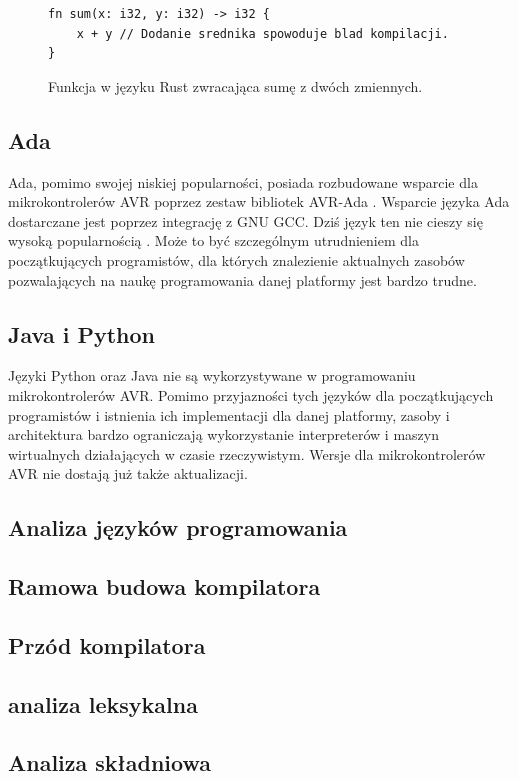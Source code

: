 \begin{figure}
\begin{lstlisting}
fn sum(x: i32, y: i32) -> i32 {
	x + y // Dodanie srednika spowoduje blad kompilacji.
}
\end{lstlisting}
\caption{Funkcja w języku Rust zwracająca sumę z dwóch zmiennych.}
\label{fig:lst:rust-fn}
\end{figure}

\subsection{Ada}
Ada, pomimo swojej niskiej popularności, posiada rozbudowane wsparcie dla mikrokontrolerów AVR poprzez zestaw bibliotek AVR-Ada \cite{AVRAdaWikiHome}. Wsparcie języka Ada dostarczane jest poprzez integrację z GNU GCC. Dziś język ten nie cieszy się wysoką popularnością \cite{SOBRAL201930Y}. Może to być szczególnym utrudnieniem dla początkujących programistów, dla których znalezienie aktualnych zasobów pozwalających na naukę programowania danej platformy jest bardzo trudne.
\subsection{Java i Python}
Języki Python oraz Java nie są wykorzystywane w programowaniu mikrokontrolerów AVR. Pomimo przyjazności tych języków dla początkujących programistów i istnienia ich implementacji dla danej platformy, zasoby i architektura bardzo ograniczają wykorzystanie interpreterów i maszyn wirtualnych działających w czasie rzeczywistym. Wersje dla mikrokontrolerów AVR nie dostają już także aktualizacji.

\subsection{Analiza języków programowania}
\subsection{Ramowa budowa kompilatora}
\subsection{Przód kompilatora}
\subsection{analiza leksykalna}
\subsection{Analiza składniowa}
